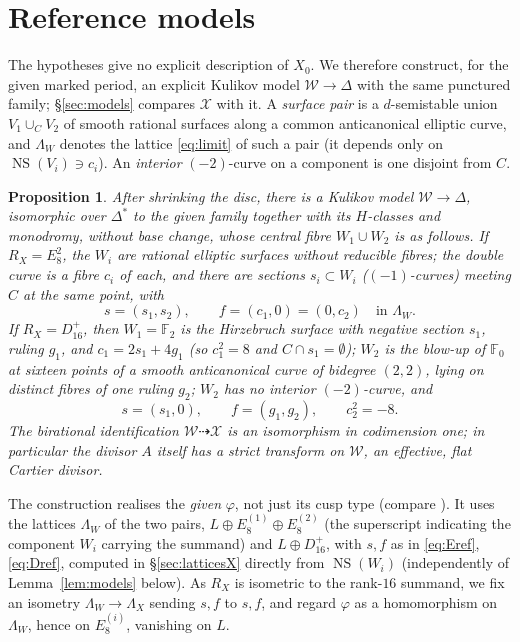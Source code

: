 \documentclass[11pt]{article}
\newcommand{\F}{\mathbb F}
\newcommand{\NS}{\operatorname{NS}}
\newcommand{\calX}{\mathcal X}
\newcommand{\calW}{\mathcal W}
\newtheorem{proposition}[theorem]{Proposition}
\theoremstyle{definition}
\theoremstyle{remark}
\begin{document}
\section{Reference models}\label{sec:reference}

The hypotheses give no explicit description of \(X_0\). We therefore
construct, for the given marked period, an explicit Kulikov model
\(\calW\to\Delta\) with the same punctured family; \S\ref{sec:models}
compares \(\calX\) with it. A \emph{surface pair} is a \(d\)-semistable union \(V_1\cup_CV_2\) of
smooth rational surfaces along a common anticanonical elliptic curve,
and \(\Lambda_W\) denotes the lattice \eqref{eq:limit} of such a pair
(it depends only on \(\NS(V_i)\ni c_i\)). An \emph{interior}
\((-2)\)-curve on a component is one disjoint from \(C\).

\begin{proposition}\label{prop:reference}
After shrinking the disc, there is a Kulikov model \(\calW\to\Delta\),
isomorphic over \(\Delta^*\) to the given family together with its
\(H\)-classes and monodromy, without base change, whose central fibre
\(W_1\cup W_2\) is as follows.
If \(R_X=E_8^2\), the \(W_i\) are rational elliptic surfaces
without reducible fibres; the double curve is a fibre \(c_i\) of each,
and there are sections \(s_i\subset W_i\) (\((-1)\)-curves) meeting
\(C\) at the same point, with
\begin{equation}\label{eq:Eref}
 s=(s_1,s_2),\qquad f=(c_1,0)=(0,c_2)\quad\text{in }\Lambda_W .
\end{equation}
If \(R_X=D_{16}^+\), then \(W_1=\F_2\) is the Hirzebruch
surface with negative section \(s_1\), ruling \(g_1\), and
\(c_1=2s_1+4g_1\) (so \(c_1^2=8\) and
\(C\cap s_1=\emptyset\)); \(W_2\) is the blow-up of \(\F_0\) at sixteen
points of a smooth anticanonical curve of bidegree \((2,2)\), lying on
distinct fibres of one ruling \(g_2\); \(W_2\) has no interior
\((-2)\)-curve, and
\begin{equation}\label{eq:Dref}
 s=(s_1,0),\qquad f=(g_1,g_2),\qquad c_2^2=-8 .
\end{equation}
The birational identification \(\calW\dashrightarrow\calX\) is an
isomorphism in codimension one; in particular the divisor \(A\)
itself has a strict transform on \(\calW\), an effective, flat Cartier
divisor.
\end{proposition}

The construction realises the \emph{given} \(\varphi\), not just its
cusp type (compare \cite[Proposition~7.23]{AE}). It uses the
lattices \(\Lambda_W\) of the two pairs,
\(L\oplus E_8^{(1)}\oplus E_8^{(2)}\) (the superscript indicating the
component \(W_i\) carrying the summand) and \(L\oplus D_{16}^+\), with
\(s,f\) as in \eqref{eq:Eref}, \eqref{eq:Dref}, computed in
\S\ref{sec:latticesX} directly from \(\NS(W_i)\) (independently of
Lemma~\ref{lem:models} below). As \(R_X\) is isometric to the rank-\(16\)
summand, we fix an isometry \(\Lambda_W\to\Lambda_X\) sending \(s,f\)
to \(s,f\), and regard \(\varphi\) as a homomorphism on \(\Lambda_W\),
hence on \(E_8^{(i)}\), vanishing on \(L\).
\end{document}
